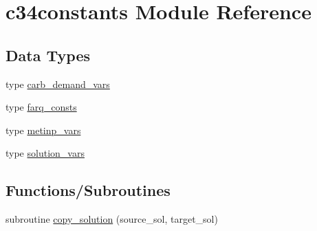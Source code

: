 \hypertarget{namespacec34constants}{}\section{c34constants Module Reference}
\label{namespacec34constants}
\subsection*{Data Types}
\begin{DoxyCompactItemize}
\item 
type \hyperlink{structc34constants_1_1carb__demand__vars}{carb\+\_\+demand\+\_\+vars}
\item 
type \hyperlink{structc34constants_1_1farq__consts}{farq\+\_\+consts}
\item 
type \hyperlink{structc34constants_1_1metinp__vars}{metinp\+\_\+vars}
\item 
type \hyperlink{structc34constants_1_1solution__vars}{solution\+\_\+vars}
\end{DoxyCompactItemize}
\subsection*{Functions/\+Subroutines}
\begin{DoxyCompactItemize}
\item 
subroutine \hyperlink{namespacec34constants_a2bf287654403f231d7936113aaeb9cf6}{copy\+\_\+solution} (source\+\_\+sol, target\+\_\+sol)
\end{DoxyCompactItemize}
